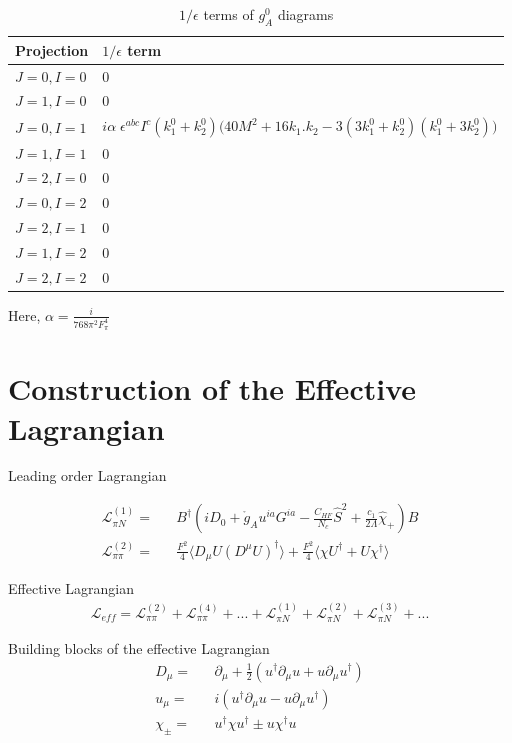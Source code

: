 \documentclass{article}
\newcommand{\bea}{\begin{eqnarray}}
\newcommand{\eea}{\end{eqnarray}}
\begin{document}
\bgroup
\def\arraystretch{2.5}%
\begin{table}
	[ht]
	\caption{$1/ \epsilon$ terms of $g_A^0$ diagrams}\label{table:gA4} 
	\begin{tabular}{ M{2.0cm} M{9.5cm}}
		\hline 
		Projection  & $1/ \epsilon$ term \\
		\hline 
		$J=0,I=0$ &  $ 0$  \\ 
		$J=1,I=0$ &  $ 0$  \\ 
		$J=0,I=1$ &  $ i\alpha\; \epsilon^{abc} I^c \left( k_1^0+k_2^0\right) \bigg( 40 M^2 +16 k_1.k_2 -3 (3k_1^0+k_2^0)(k_1^0+3k_2^0) \bigg) $  \\ 
		$J=1,I=1$ &  $  0 $\\
		$J=2,I=0$ &  $  0 $  \\ 
		$J=0,I=2$ &  $ 0 $  \\ 
		$J=2,I=1$ &  $  0 $  \\ 
		$J=1,I=2$ &  $  0 $  \\ 
		$J=2,I=2$ &  $  0 $  \\ 
		\hline
	\end{tabular}
\end{table}
\egroup

Here, $\alpha= \frac{ i}{768 \pi^2 F_\pi^4} $



\newpage
\section{Construction of the Effective Lagrangian}

Leading order Lagrangian

\bea
\mathcal{L}_{\pi N}^{(1)} = && B^{\dag} \left( iD_0 + \mathring{g}_A u^{ia} G^{ia} -\frac{C_{HF}}{N_c} \hat{S}^2 +\frac{c_1}{2 \Lambda } \hat{\chi}_+ \right) B \nonumber \\
\mathcal{L}_{\pi \pi}^{(2)} = && \frac{F^{2}}{4} \Big \langle D_{\mu} U (D^{\mu} U)^{\dag} \Big \rangle +\frac{F^{2}}{4} \Big \langle   \chi U^{\dag}  +U \chi ^{\dag} \Big \rangle \nonumber
\eea

Effective Lagrangian
\bea
\mathcal{L}_{eff} = \mathcal{L}_{\pi \pi}^{(2)} +\mathcal{L}_{\pi \pi}^{(4)}+...+\mathcal{L}_{\pi N}^{(1)}+\mathcal{L}_{\pi N}^{(2)}+\mathcal{L}_{\pi N}^{(3)}+...\nonumber
\eea


Building blocks of the effective Lagrangian
\bea
D_{\mu} = && \partial_{\mu}+ \frac{1}{2} \left(  u^{\dag} \partial_{\mu} u + u \partial_{\mu} u^{\dag} \right)  \nonumber\\
u_{\mu} = && i \left(  u^{\dag} \partial_{\mu} u - u \partial_{\mu} u^{\dag} \right) \nonumber\\
\chi_{\pm}  = && u^{\dagger} \chi u^{\dagger} \pm u \chi^{\dagger} u \nonumber
\eea
\end{document}
